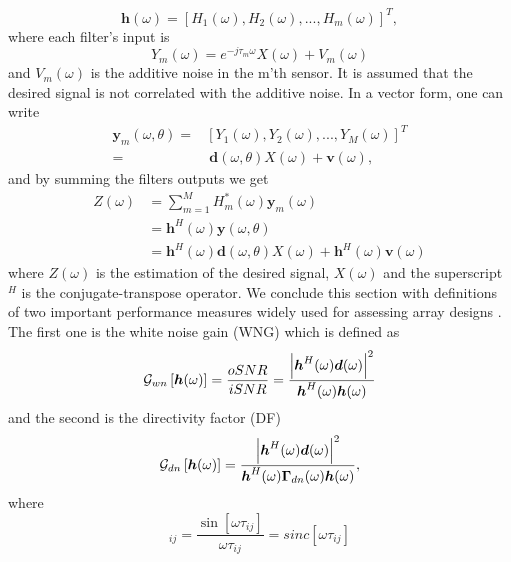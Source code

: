 \documentclass{article}
\begin{document}
\begin{equation}
\boldsymbol{h}(\omega)=\left[H_1(\omega),H_2(\omega),...,H_m(\omega)\right]^T,
\end{equation}
where each filter's input is
\begin{equation}
Y_m(\omega)=e^{-j\tau_m\omega}X(\omega)+V_m(\omega)
\end{equation}
and $ V_m(\omega) $ is the additive noise in the m'th sensor. It is assumed that the desired signal is not correlated with the additive noise. In a vector form, one can write
\begin{equation}
\begin{split}
\boldsymbol{y}_m(\omega,\theta)=&\left[Y_1(\omega),Y_2(\omega),...,Y_M(\omega)\right]^T 
\\
=& \ \boldsymbol{d}(\omega,\theta)X(\omega)+\boldsymbol{v}(\omega),
\end{split}
\end{equation}
and by summing the filters outputs we get
\begin{equation}
\begin{split}
Z(\omega)&=\sum_{m=1}^{M}{H_m^*(\omega)\boldsymbol{y}_m(\omega)}
\\ & =\boldsymbol{h}^H(\omega)\boldsymbol{y}(\omega,\theta)
\\ & =\boldsymbol{h}^H(\omega)\boldsymbol{d}(\omega,\theta)X(\omega)+\boldsymbol{h}^H(\omega)\boldsymbol{v}(\omega)
\end{split}
\end{equation}
where $ Z(\omega) $ is the estimation of the desired signal, $ X(\omega) $ and the superscript $ ^H $ is the conjugate-transpose operator. %
We conclude this section with definitions of two important performance measures widely used for assessing array designs \cite{sps17}. The first one is  the white noise gain (WNG) which is defined as  
\begin{equation}
{\cal G}_{wn}\left[\boldsymbol{h}(\omega)\right]=\frac{oSNR}{iSNR}=\frac{\left|\boldsymbol{h}^H(\omega)\boldsymbol{d}(\omega)\right|^2}{\boldsymbol{h}^H(\omega)\boldsymbol{h}(\omega)}
\end{equation}
and the second is the directivity factor (DF) 
\begin{equation}
{\cal G}_{dn}\left[\boldsymbol{h}(\omega)\right]=\frac{\left|\boldsymbol{h}^H(\omega)\boldsymbol{d}(\omega)\right|^2}{\boldsymbol{h}^H(\omega)\boldsymbol{\Gamma}_{dn}(\omega)\boldsymbol{h}(\omega)},	
\end{equation}
where 
\begin{equation}
[\boldsymbol{\Gamma}_{dn}(\omega)]_{ij}=\frac{\sin{[\omega\tau_{ij}]}}{\omega\tau_{ij}}=sinc\left[\omega\tau_{ij}\right]
\end{equation}
\end{document}
